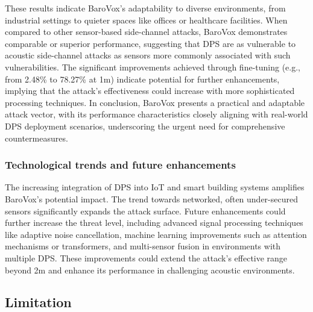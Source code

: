 These results indicate BaroVox's adaptability to diverse environments, from industrial settings to quieter spaces like offices or healthcare facilities. When compared to other sensor-based side-channel attacks, BaroVox demonstrates comparable or superior performance, suggesting that DPS are as vulnerable to acoustic side-channel attacks as sensors more commonly associated with such vulnerabilities. The significant improvements achieved through fine-tuning (e.g., from 2.48\% to 78.27\% at 1m) indicate potential for further enhancements, implying that the attack's effectiveness could increase with more sophisticated processing techniques. In conclusion, BaroVox presents a practical and adaptable attack vector, with its performance characteristics closely aligning with real-world DPS deployment scenarios, underscoring the urgent need for comprehensive countermeasures.

\subsubsection{Technological trends and future enhancements}
The increasing integration of DPS into IoT and smart building systems amplifies BaroVox's potential impact. The trend towards networked, often under-secured sensors significantly expands the attack surface. Future enhancements could further increase the threat level, including advanced signal processing techniques like adaptive noise cancellation, machine learning improvements such as attention mechanisms or transformers, and multi-sensor fusion in environments with multiple DPS. These improvements could extend the attack's effective range beyond 2m and enhance its performance in challenging acoustic environments.

 
\color{black}
\subsection{Limitation}



